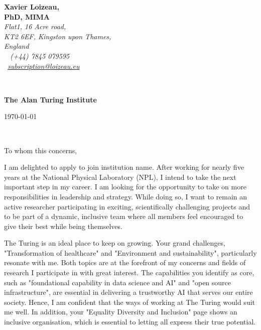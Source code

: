 \documentclass[12pt]{article}
\begin{document}
\sffamily   %
\hfill%
\begin{minipage}[t]{.6\textwidth}
\raggedleft%
{\bfseries Xavier Loizeau, \\ PhD, MIMA}\\[.35ex]
\small\itshape%
Flat1, 16 Acre road,\\
KT2 6EF, Kingston upon Thames,\\
England\\[.35ex]
\faMobile~ (+44) 7845 079595\\
\faAt~\href{mailto:subscription@loizeau.eu}{subscription@loizeau.eu}
\end{minipage}\\[1em]
%
\begin{minipage}[t]{.4\textwidth}
\raggedright%
{\bfseries The Alan Turing Institute}\\
\end{minipage}
\hfill %
\begin{minipage}[t]{.4\textwidth}
\raggedleft %
\today
\end{minipage}\\
\raggedright

To whom this concerns,

I am delighted to apply to join {\color{red} institution name}.
After working for nearly five years at the National Physical Laboratory (NPL), I intend to take the next important step in my career.
I am looking for the opportunity to take on more responsibilities in leadership and strategy.
While doing so, I want to remain an active researcher participating in exciting, scientifically challenging projects and to be part of a dynamic, inclusive team where all members feel encouraged to give their best while being themselves.

\medskip

The Turing is an ideal place to keep on growing.
Your grand challenges, "Transformation of healthcare" and "Environment and sustainability", particularly resonate with me.
Both topics are at the forefront of my concerns and fields of research I participate in with great interest.
The capabilities you identify as core, such as "foundational capability in data science and AI" and "open source infrastructure", are essential in delivering a trustworthy AI that serves our entire society.
Hence, I am confident that the ways of working at The Turing would suit me well.
In addition, your "Equality Diversity and Inclusion" page shows an inclusive organisation, which is essential to letting all express their true potential.
\end{document}
